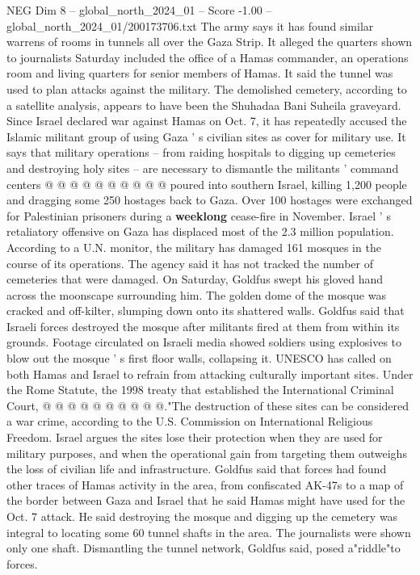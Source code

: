 \begin{textsample}{NEG Dim 8 – global\_north\_2024\_01 – Score -1.00 – global\_north\_2024\_01/200173706.txt}
The army says it has found similar warrens of rooms in tunnels all over the Gaza Strip.
It alleged the quarters shown to journalists Saturday included the office of a Hamas commander, an operations room and living quarters for senior members of Hamas.
It said the tunnel was used to plan attacks against the military.
The demolished cemetery, according to a satellite analysis, appears to have been the Shuhadaa Bani Suheila graveyard.
Since Israel declared war against Hamas on Oct. 7, it has repeatedly accused the Islamic militant group of using Gaza ' s civilian sites as cover for military use.
It says that military operations -- from raiding hospitals to digging up cemeteries and destroying holy sites -- are necessary to dismantle the militants ' command centers @ @ @ @ @ @ @ @ @ @ poured into southern Israel, killing 1,200 people and dragging some 250 hostages back to Gaza.
Over 100 hostages were exchanged for Palestinian prisoners during a \textbf{weeklong} cease-fire in November.
Israel ' s retaliatory offensive on Gaza has displaced most of the 2.3 million population.
According to a U.N. monitor, the military has damaged 161 mosques in the course of its operations.
The agency said it has not tracked the number of cemeteries that were damaged.
On Saturday, Goldfus swept his gloved hand across the moonscape surrounding him.
The golden dome of the mosque was cracked and off-kilter, slumping down onto its shattered walls.
Goldfus said that Israeli forces destroyed the mosque after militants fired at them from within its grounds.
Footage circulated on Israeli media showed soldiers using explosives to blow out the mosque ' s first floor walls, collapsing it.
UNESCO has called on both Hamas and Israel to refrain from attacking culturally important sites.
Under the Rome Statute, the 1998 treaty that established the International Criminal Court, @ @ @ @ @ @ @ @ @ @."The destruction of these sites can be considered a war crime, according to the U.S.
Commission on International Religious Freedom.
Israel argues the sites lose their protection when they are used for military purposes, and when the operational gain from targeting them outweighs the loss of civilian life and infrastructure.
Goldfus said that forces had found other traces of Hamas activity in the area, from confiscated AK-47s to a map of the border between Gaza and Israel that he said Hamas might have used for the Oct. 7 attack.
He said destroying the mosque and digging up the cemetery was integral to locating some 60 tunnel shafts in the area.
The journalists were shown only one shaft.
Dismantling the tunnel network, Goldfus said, posed a"riddle"to forces.

\end{textsample}
